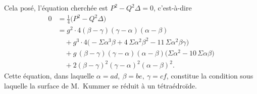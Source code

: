 \documentclass[11pt]{article}
\begin{document}
Cela pos\'e, l'\'equation cherch\'ee est $P^{2} - Q^{2}\Delta = 0$, c'est-\`a-dire
\begin{align*}
0 &= \tfrac{1}{4}\bigl(P^{2} - Q^{2}\Delta\bigr) \\
&= g^{2} \cdot 4(\beta-\gamma)(\gamma-\alpha)(\alpha-\beta) \\
& \quad + g^{3} \cdot 4\bigl(-\Sigma \alpha^{3}\beta + 4\,\Sigma \alpha^{2}\beta^{2} - 11\,\Sigma \alpha^{2}\beta\gamma\bigr) \\
& \quad + g\,(\beta-\gamma)(\gamma-\alpha)(\alpha-\beta)\bigl(\Sigma \alpha^{2} - 10\,\Sigma \alpha\beta\bigr) \\
& \quad + 2(\beta-\gamma)^{2}(\gamma-\alpha)^{2}(\alpha-\beta)^{2}.
\end{align*}
Cette \'equation, dans laquelle $\alpha = ad,\ \beta = be,\ \gamma = cf$, constitue la condition sous laquelle la surface de M.~Kummer se r\'eduit \`a un t\'etra\'edro\"ide.
\end{document}
